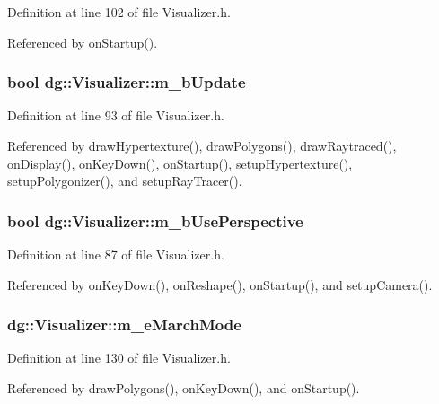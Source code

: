 Definition at line 102 of file Visualizer.h.

Referenced by on\-Startup().
\subsubsection{\setlength{\rightskip}{0pt plus 5cm}bool dg::Visualizer::m\_\-b\-Update\hspace{0.3cm}{\tt  [protected]}}\label{classdg_1_1Visualizer_n7}




Definition at line 93 of file Visualizer.h.

Referenced by draw\-Hypertexture(), draw\-Polygons(), draw\-Raytraced(), on\-Display(), on\-Key\-Down(), on\-Startup(), setup\-Hypertexture(), setup\-Polygonizer(), and setup\-Ray\-Tracer().
\subsubsection{\setlength{\rightskip}{0pt plus 5cm}bool dg::Visualizer::m\_\-b\-Use\-Perspective\hspace{0.3cm}{\tt  [protected]}}\label{classdg_1_1Visualizer_n5}




Definition at line 87 of file Visualizer.h.

Referenced by on\-Key\-Down(), on\-Reshape(), on\-Startup(), and setup\-Camera().
\subsubsection{ dg::Visualizer::m\_\-e\-March\-Mode\hspace{0.3cm}{\tt  [protected]}}\label{classdg_1_1Visualizer_n28}




Definition at line 130 of file Visualizer.h.

Referenced by draw\-Polygons(), on\-Key\-Down(), and on\-Startup().

